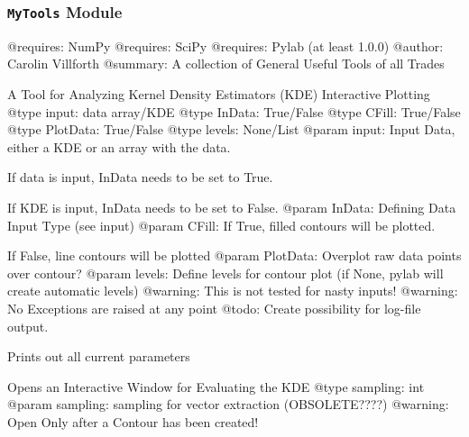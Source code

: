 \documentclass[letterpaper,10pt,english]{sphinxmanual}
\begin{document}
\subsubsection{\texttt{MyTools} Module}
\label{SamPy.sandbox:module-SamPy.sandbox.MyTools}\label{SamPy.sandbox:mytools-module}
@requires: NumPy
@requires: SciPy
@requires: Pylab (at least 1.0.0)
@author: Carolin Villforth
@summary: A collection of General Useful Tools of all Trades


\begin{fulllineitems}
\label{SamPy.sandbox:SamPy.sandbox.MyTools.AnaKDE}
A Tool for Analyzing Kernel Density Estimators (KDE)
Interactive Plotting
@type input: data array/KDE
@type InData: True/False
@type CFill: True/False
@type PlotData: True/False
@type levels: None/List
@param input: Input Data, either a KDE or an array with the data.

If data is input, InData needs to be set to True.

If KDE is input, InData needs to be set to False.
@param InData: Defining Data Input Type (see input)
@param CFill: If True, filled contours will be plotted.

If False, line contours will be plotted
@param PlotData: Overplot raw data points over contour?
@param levels: Define levels for contour plot (if None, pylab will create automatic levels)
@warning: This is not tested for nasty inputs!
@warning: No Exceptions are raised at any point
@todo: Create possibility for log-file output.


\begin{fulllineitems}
\label{SamPy.sandbox:SamPy.sandbox.MyTools.AnaKDE.Info}
Prints out all current parameters

\end{fulllineitems}



\begin{fulllineitems}
\label{SamPy.sandbox:SamPy.sandbox.MyTools.AnaKDE.OpenInteractive}
Opens an Interactive Window for Evaluating the KDE
@type sampling: int
@param sampling: sampling for vector extraction (OBSOLETE????)
@warning: Open Only after a Contour has been created!


\end{fulllineitems}
\end{fulllineitems}
\end{document}

